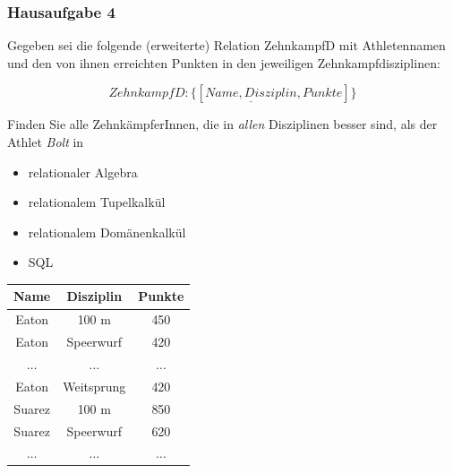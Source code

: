 \begin{frame}[fragile]
	\frametitle{Hausaufgabe 4}
	\vspace{0.25cm}

	\begin{multicols}{2}
		Gegeben sei die folgende (erweiterte) Relation ZehnkampfD mit 
		Athletennamen und den von ihnen erreichten Punkten in den jeweiligen Zehnkampfdisziplinen:

		\[ ZehnkampfD: \{[ \underline{Name, Disziplin}, Punkte ]\} \]

		Finden Sie alle ZehnkämpferInnen, die in \textit{allen} Disziplinen besser sind,
		als der Athlet \textit{Bolt} in
		\begin{itemize}
			\item relationaler Algebra
			\item relationalem Tupelkalkül
			\item relationalem Domänenkalkül
			\item SQL
		\end{itemize}
		\vfill\columnbreak

		\begin{table}[]
			\begin{tabular}{c|c|c}
				Name         & Disziplin    & Punkte      \\ \hline
				Eaton        & 100 m        & 450         \\
				Eaton        & Speerwurf    & 420         \\
				\( \hdots \) & \( \hdots \) & \( \hdots\) \\
				Eaton        & Weitsprung   & 420         \\
				Suarez       & 100 m        & 850         \\
				Suarez       & Speerwurf    & 620         \\
				\( \hdots \) & \( \hdots \) & \( \hdots\) \\
			\end{tabular}
		\end{table}
	\end{multicols}
\end{frame}

